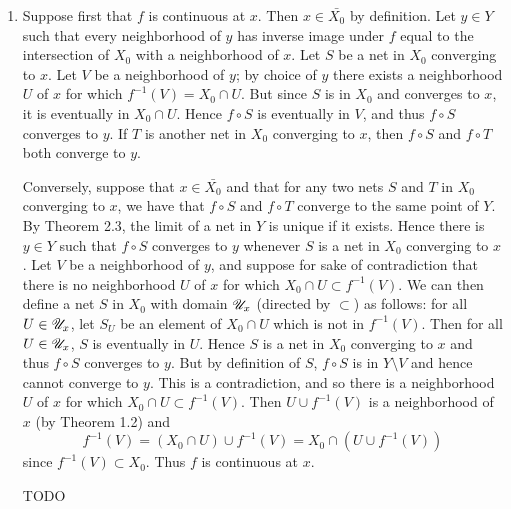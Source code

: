 \begin{prob}
\begin{enumerate}
\item Suppose first that $f$ is continuous at $x$. Then $x \in \bar{X_0}$ by definition. Let $y \in Y$ such that every neighborhood of $y$ has inverse image under $f$ equal to the intersection of $X_0$ with a neighborhood of $x$. Let $S$ be a net in $X_0$ converging to $x$. Let $V$ be a neighborhood of $y$; by choice of $y$ there exists a neighborhood $U$ of $x$ for which $f^{-1}(V) = X_0\cap U$. But since $S$ is in $X_0$ and converges to $x$, it is eventually in $X_0\cap U$. Hence $f\circ S$ is eventually in $V$, and thus $f\circ S$ converges to $y$. If $T$ is another net in $X_0$ converging to $x$, then $f\circ S$ and $f\circ T$ both converge to $y$.

Conversely, suppose that $x \in \bar{X_0}$ and that for any two nets $S$ and $T$ in $X_0$ converging to $x$, we have that $f\circ S$ and $f\circ T$ converge to the same point of $Y$. By Theorem 2.3, the limit of a net in $Y$ is unique if it exists. Hence there is $y \in Y$ such that $f\circ S$ converges to $y$ whenever $S$ is a net in $X_0$ converging to $x$. Let $V$ be a neighborhood of $y$, and suppose for sake of contradiction that there is no neighborhood $U$ of $x$ for which $X_0\cap U \subset f^{-1}(V)$. We can then define a net $S$ in $X_0$ with domain $\mathscr{U}_x$ (directed by $\subset$) as follows: for all $U \in \mathscr{U}_x$, let $S_U$ be an element of $X_0\cap U$ which is not in $f^{-1}(V)$. Then for all $U \in \mathscr{U}_x$, $S$ is eventually in $U$. Hence $S$ is a net in $X_0$ converging to $x$ and thus $f\circ S$ converges to $y$. But by definition of $S$, $f\circ S$ is in $Y\setminus V$ and hence cannot converge to $y$. This is a contradiction, and so there is a neighborhood $U$ of $x$ for which $X_0\cap U \subset f^{-1}(V)$. Then $U\cup f^{-1}(V)$ is a neighborhood of $x$ (by Theorem 1.2) and \[f^{-1}(V) = (X_0\cap U)\cup f^{-1}(V) = X_0\cap(U\cup f^{-1}(V))\] since $f^{-1}(V) \subset X_0$. Thus $f$ is continuous at $x$.

\item [TODO]
\end{enumerate}
\end{prob}

